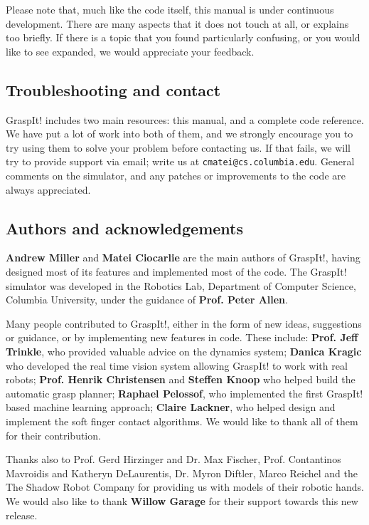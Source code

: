 Please note that, much like the code itself, this manual is under
continuous development. There are many aspects that it does not touch
at all, or explains too briefly. If there is a topic that you found
particularly confusing, or you would like to see expanded, we would
appreciate your feedback.

\subsection{Troubleshooting and contact}

GraspIt! includes two main resources: this manual, and a complete code
reference. We have put a lot of work into both of them, and we
strongly encourage you to try using them to solve your problem before
contacting us. If that fails, we will try to provide support via
email; write us at \texttt{cmatei@cs.columbia.edu}. General comments
on the simulator, and any patches or improvements to the code are
always appreciated.

\subsection{Authors and acknowledgements}

\textbf{Andrew Miller} and \textbf{Matei Ciocarlie} are the main
authors of GraspIt!, having designed most of its features and
implemented most of the code. The GraspIt! simulator was developed in
the Robotics Lab, Department of Computer Science, Columbia University,
under the guidance of \textbf{Prof. Peter Allen}.

Many people contributed to GraspIt!, either in the form of new ideas,
suggestions or guidance, or by implementing new features in
code. These include: \textbf{Prof. Jeff Trinkle}, who provided
valuable advice on the dynamics system; \textbf{Danica Kragic} who
developed the real time vision system allowing GraspIt! to work with
real robots; \textbf{Prof. Henrik Christensen} and \textbf{Steffen
  Knoop} who helped build the automatic grasp planner; \textbf{Raphael
  Pelossof}, who implemented the first GraspIt! based machine learning
approach; \textbf{Claire Lackner}, who helped design and implement the
soft finger contact algorithms. We would like to thank all of them for
their contribution.

Thanks also to Prof. Gerd Hirzinger and Dr. Max Fischer,
Prof. Contantinos Mavroidis and Katheryn DeLaurentis, Dr. Myron
Diftler, Marco Reichel and the The Shadow Robot Company for providing
us with models of their robotic hands. We would also like to thank
\textbf{Willow Garage} for their support towards this new release.

